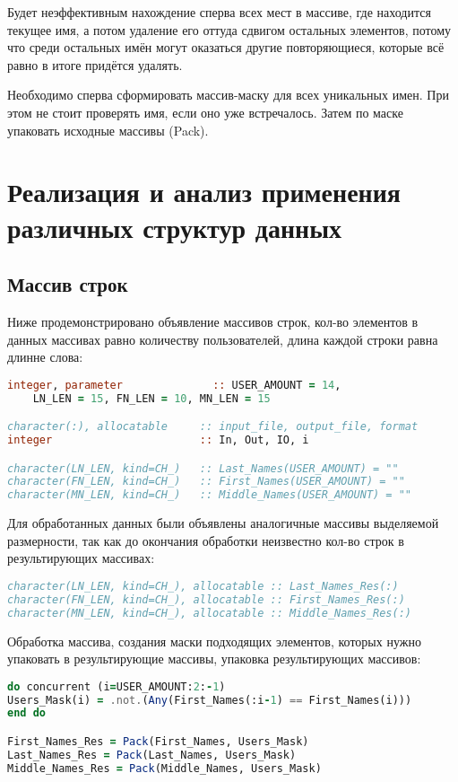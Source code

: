 \documentclass[a4paper,12pt]{article}
\begin{document}
Будет неэффективным нахождение сперва всех мест в массиве, где находится текущее имя, а потом удаление его оттуда сдвигом остальных элементов, потому что среди остальных имён могут оказаться другие повторяющиеся, которые всё равно в итоге придётся удалять.

Необходимо сперва сформировать массив-маску для всех уникальных имен. При этом не стоит проверять имя, если оно уже встречалось. Затем по маске упаковать исходные массивы (Pack).
\newpage

\begin{center}\end{center}
\section{Реализация и анализ применения различных структур данных}

\subsection{Массив строк}
Ниже продемонстрировано объявление массивов строк, кол-во элементов в данных массивах равно количеству пользователей, длина каждой строки равна длинне слова:
\begin{lstlisting}[language=Fortran]
integer, parameter              :: USER_AMOUNT = 14, 
	LN_LEN = 15, FN_LEN = 10, MN_LEN = 15

character(:), allocatable     :: input_file, output_file, format
integer                       :: In, Out, IO, i

character(LN_LEN, kind=CH_)   :: Last_Names(USER_AMOUNT) = ""
character(FN_LEN, kind=CH_)   :: First_Names(USER_AMOUNT) = ""
character(MN_LEN, kind=CH_)   :: Middle_Names(USER_AMOUNT) = ""
\end{lstlisting}

Для обработанных данных были объявлены аналогичные массивы выделяемой размерности, так как до окончания обработки неизвестно кол-во строк в результирующих массивах:
\begin{lstlisting}[language=Fortran]
character(LN_LEN, kind=CH_), allocatable :: Last_Names_Res(:)
character(FN_LEN, kind=CH_), allocatable :: First_Names_Res(:)
character(MN_LEN, kind=CH_), allocatable :: Middle_Names_Res(:)
\end{lstlisting}

Обработка массива, создания маски подходящих элементов, которых нужно упаковать в результирующие массивы, упаковка результирующих массивов:
\begin{lstlisting}[language=Fortran]
do concurrent (i=USER_AMOUNT:2:-1)
Users_Mask(i) = .not.(Any(First_Names(:i-1) == First_Names(i)))
end do

First_Names_Res = Pack(First_Names, Users_Mask)
Last_Names_Res = Pack(Last_Names, Users_Mask)
Middle_Names_Res = Pack(Middle_Names, Users_Mask)
\end{lstlisting}
\end{document}
